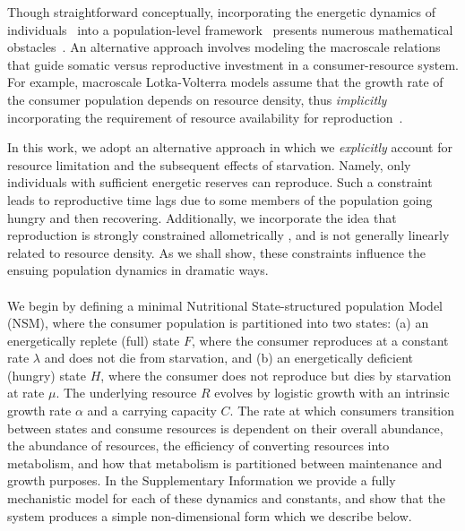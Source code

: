 \documentclass[twocolumn,preprintnumbers,amsmath,amssymb,superscriptaddress]{revtex4}
\begin{document}
\begin{bibunit}[unsrt]
Though straightforward conceptually, incorporating the energetic dynamics of individuals~\citep{Kooi2000} into a population-level framework~\citep{Kooi2000,Sousa:2010ez} presents numerous mathematical obstacles~\citep{Diekmann:2010da}.
An alternative approach involves modeling the macroscale relations that guide somatic versus reproductive investment in a consumer-resource system.
For example, macroscale Lotka-Volterra models assume that the growth rate of the consumer population depends on resource density, thus \emph{implicitly} incorporating the requirement of resource availability for reproduction~\citep{murdoch:2003}.

In this work, we adopt an alternative approach in which we \emph{explicitly} account for resource limitation and the subsequent effects of starvation.
Namely, only individuals with sufficient energetic reserves can reproduce.
Such a constraint leads to reproductive time lags due to some members of the population going hungry and then recovering.
Additionally, we incorporate the idea that reproduction is strongly constrained allometrically \citep{Kempes:2012hy}, and is not generally linearly related to resource density.
As we shall show, these constraints influence the ensuing population dynamics in dramatic ways.\\



\\
We begin by defining a minimal Nutritional State-structured population Model (NSM), where the consumer population is partitioned into two states: (a) an energetically replete (full) state $F$, where the consumer reproduces at a constant rate $\lambda$ and does not die from starvation, and (b) an energetically deficient (hungry) state $H$, where the consumer does not reproduce but dies by starvation at rate $\mu$. The underlying resource $R$ evolves by logistic growth with an intrinsic growth rate $\alpha$ and a carrying capacity $C$. The rate at which consumers transition between states and consume resources is dependent on their overall abundance, the abundance of resources, the efficiency of converting resources into metabolism, and how that metabolism is partitioned between maintenance and growth purposes. In the Supplementary Information we provide a fully mechanistic model for each of these dynamics and constants, and show that the system produces a simple non-dimensional form which we describe below.


\end{bibunit}
\end{document}
